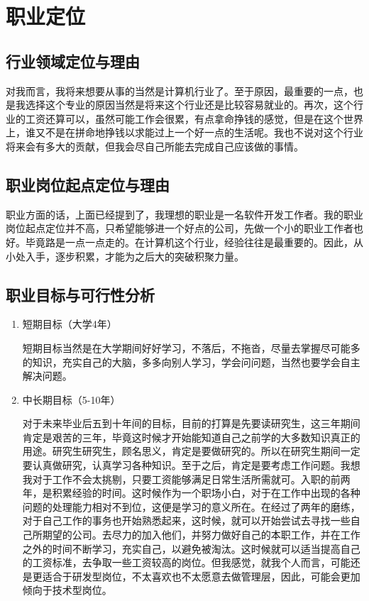 \documentclass{article}
\begin{document}
\section{职业定位}
\par

\subsection{行业领域定位与理由}
对我而言，我将来想要从事的当然是计算机行业了。至于原因，最重要的一点，也是我选择这个专业的原因当然是将来这个行业还是比较容易就业的。再次，这个行业的工资还算可以，虽然可能工作会很累，有点拿命挣钱的感觉，但是在这个世界上，谁又不是在拼命地挣钱以求能过上一个好一点的生活呢。我也不说对这个行业将来会有多大的贡献，但我会尽自己所能去完成自己应该做的事情。\par
\subsection{职业岗位起点定位与理由}
职业方面的话，上面已经提到了，我理想的职业是一名软件开发工作者。我的职业岗位起点定位并不高，只希望能够进一个好点的公司，先做一个小的职业工作者也好。毕竟路是一点一点走的。在计算机这个行业，经验往往是最重要的。因此，从小处入手，逐步积累，才能为之后大的突破积聚力量。\par
\subsection{职业目标与可行性分析}
\par
\par 
\begin{enumerate}[(1)]
	\item 短期目标（大学4年）\par 
	短期目标当然是在大学期间好好学习，不落后，不拖沓，尽量去掌握尽可能多的知识，充实自己的大脑，多多向别人学习，学会问问题，当然也要学会自主解决问题。\par 
	\item 中长期目标（5-10年）\par 
	对于未来毕业后五到十年间的目标，目前的打算是先要读研究生，这三年期间肯定是艰苦的三年，毕竟这时候才开始能知道自己之前学的大多数知识真正的用途。研究生研究生，顾名思义，肯定是要做研究的。所以在研究生期间一定要认真做研究，认真学习各种知识。至于之后，肯定是要考虑工作问题。我想我对于工作不会太挑剔，只要工资能够满足日常生活所需就可。入职的前两年，是积累经验的时间。这时候作为一个职场小白，对于在工作中出现的各种问题的处理能力相对不到位，这便是学习的意义所在。在经过了两年的磨练，对于自己工作的事务也开始熟悉起来，这时候，就可以开始尝试去寻找一些自己所期望的公司。去尽力的加入他们，并努力做好自己的本职工作，并在工作之外的时间不断学习，充实自己，以避免被淘汰。这时候就可以适当提高自己的工资标准，去争取一些工资较高的岗位。但我感觉，就我个人而言，可能还是更适合于研发型岗位，不太喜欢也不太愿意去做管理层，因此，可能会更加倾向于技术型岗位。\par 
	
\end{enumerate}
\end{document}

